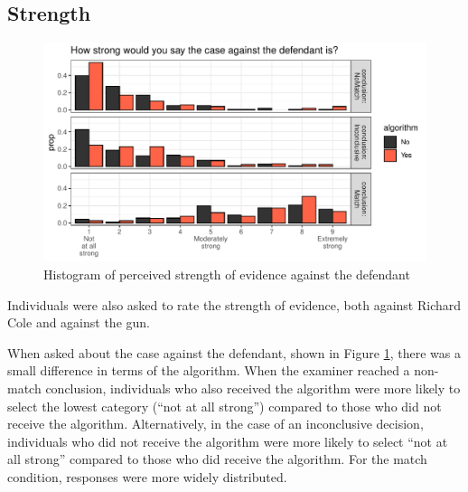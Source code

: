 \documentclass[print]{nuthesis}
\begin{document}
\hypertarget{strength}{%
\subsection{Strength}\label{strength}}

\begin{figure}

{\centering \includegraphics[width=\linewidth]{thesis_files/figure-latex/strength-1} 

}

\caption{Histogram of perceived strength of evidence against the defendant}\label{fig:strength}
\end{figure}

Individuals were also asked to rate the strength of evidence, both against Richard Cole and against the gun.

When asked about the case against the defendant, shown in Figure \ref{fig:strength}, there was a small difference in terms of the algorithm.
When the examiner reached a non-match conclusion, individuals who also received the algorithm were more likely to select the lowest category (``not at all strong'') compared to those who did not receive the algorithm.
Alternatively, in the case of an inconclusive decision, individuals who did not receive the algorithm were more likely to select ``not at all strong'' compared to those who did receive the algorithm.
For the match condition, responses were more widely distributed.
\end{document}
